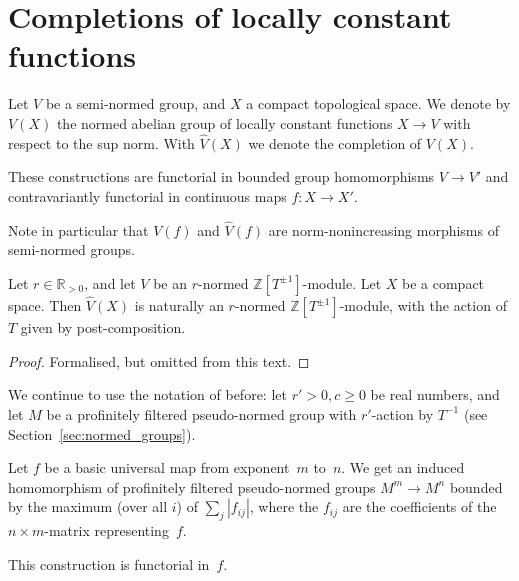 \section{Completions of locally constant functions}

\begin{definition}
  \label{CLC}
  \leanok
  Let $V$ be a semi-normed group, and $X$ a compact topological space.
  We denote by $V(X)$ the normed abelian group of locally constant functions $X \to V$
  with respect to the sup norm.
  With $\hat V(X)$ we denote the completion of $V(X)$.

  These constructions are functorial in bounded group homomorphisms $V \to V'$
  and contravariantly functorial in continuous maps $f \colon X \to X'$.

  Note in particular that $V(f)$ and $\hat V(f)$ are norm-nonincreasing
  morphisms of semi-normed groups.
\end{definition}

\begin{lemma}
  \label{CLC_normed_with_aut}
  \leanok
  Let $r \in \mathbb R_{> 0}$,
  and let $V$ be an $r$-normed $\mathbb Z[T^{\pm 1}]$-module.
  Let $X$ be a compact space.
  Then $\hat V(X)$ is naturally an $r$-normed $\mathbb Z[T^{\pm 1}]$-module,
  with the action of $T$ given by post-composition.
\end{lemma}

\begin{proof}
  \leanok
  Formalised, but omitted from this text.
\end{proof}

We continue to use the notation of before:
let $r' > 0, c \ge 0$ be real numbers,
and let $M$ be a profinitely filtered pseudo-normed group with $r'$-action by $T^{-1}$
(see Section~\ref{sec:normed_groups}).

\begin{lemma}
  \label{basic_eval_FP}
  \leanok
  Let $f$ be a basic universal map from exponent~$m$ to~$n$.
  We get an induced homomorphism of
  profinitely filtered pseudo-normed groups $M^m \to M^n$
  bounded by the maximum (over all $i$) of $\sum_j |f_{ij}|$,
  where the $f_{ij}$ are the coefficients of the $n \times m$-matrix representing~$f$.

  This construction is functorial in~$f$.
\end{lemma}

